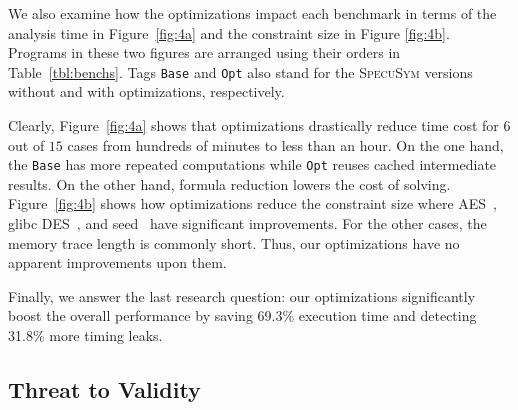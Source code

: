 \documentclass[sigconf,screen]{acmart}
\newcommand{\SpecuSym}{\textsc{SpecuSym} }
\begin{document}
\begin{table}%
\caption{The performance boost due to optimizations. }
\vspace{-0.5em}
\label{tbl:opt}
\centering
{}
\vspace{-2ex}
\end{table}







We also examine how the optimizations impact each benchmark in terms of 
the analysis time in Figure~\ref{fig:4a} and the constraint size in Figure
\ref{fig:4b}. Programs in these two figures are arranged using their orders 
in Table~\ref{tbl:benchs}. Tags \texttt{Base} and \texttt{Opt} also stand 
for the \SpecuSym versions without and with optimizations, respectively. 


Clearly, Figure~\ref{fig:4a} shows that optimizations drastically reduce 
time cost for $6$ out of $15$ cases from hundreds of minutes to less than 
an hour. On the one hand, the \texttt{Base} has more repeated computations 
while \texttt{Opt} reuses cached intermediate results. On the other hand, 
formula reduction lowers the cost of solving. Figure~\ref{fig:4b} shows 
how optimizations reduce the constraint size where AES~\cite{LibTomCrypt}, 
glibc DES~\cite{glibc}, and seed~\cite{Tegra} have significant improvements. 
For the other cases, the memory trace length is commonly short. Thus, our 
optimizations have no apparent improvements upon them.


Finally, we answer the last research question: our optimizations significantly 
boost the overall performance by saving 69.3\% execution time and detecting 
31.8\% more timing leaks.



\subsection{Threat to Validity}
\label{sec:threat_validity}
\end{document}
